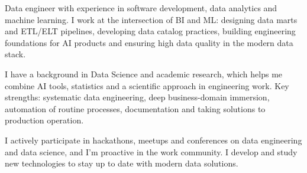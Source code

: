 

\begin{cvparagraph}

Data engineer with experience in software development, data analytics and machine learning. I work at the intersection of BI and ML: designing data marts and ETL/ELT pipelines, developing data catalog practices, building engineering foundations for AI products and ensuring high data quality in the modern data stack.

I have a background in Data Science and academic research, which helps me combine AI tools, statistics and a scientific approach in engineering work. Key strengths: systematic data engineering, deep business-domain immersion, automation of routine processes, documentation and taking solutions to production operation.

I actively participate in hackathons, meetups and conferences on data engineering and data science, and I'm proactive in the work community. I develop and study new technologies to stay up to date with modern data solutions.
\end{cvparagraph}
